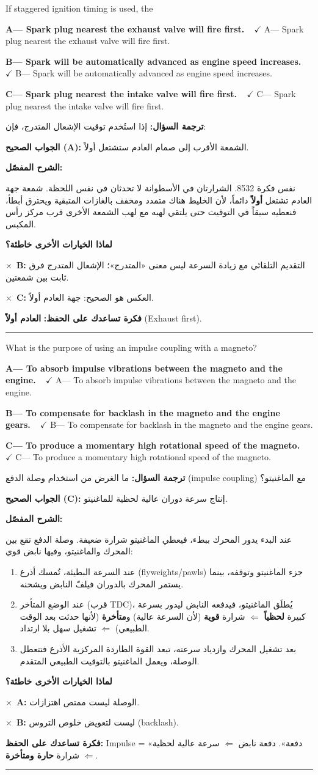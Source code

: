 \documentclass[11pt,a4paper]{article}
\newcommand{\en}[1]{\textenglish{#1}}
\newcommand{\correctletter}{}
\newcommand{\opt}[2]{%
  \ifdefstring{\correctletter}{#1}%
    {\textcolor{ansgreen}{\textbf{#1— #2\ \ $\checkmark$}}}%
    {#1— #2}\par}
\newcommand{\Q}[6]{%
  \renewcommand{\correctletter}{#6}%
  \par\bigskip
  \phantomsection\label{q#1}%
  \begin{tcolorbox}[enhanced,breakable,colback=qback,colframe=qframe,
      arc=2mm,boxrule=0.8pt,fonttitle=\bfseries,
      title={\en{Question #1}}]
    \begin{english}
      #2\par\smallskip
      \opt{A}{#3}\opt{B}{#4}\opt{C}{#5}
    \end{english}
  \end{tcolorbox}}
\newcommand{\tr}[1]{\textbf{\textcolor{qframe}{ترجمة السؤال:}} #1\par}
\newcommand{\ans}[2]{%
  \begin{tcolorbox}[colback=ansback,colframe=ansgreen,boxrule=0.6pt,arc=1.5mm,
      left=4pt,right=4pt,top=2pt,bottom=2pt]
    \textbf{\textcolor{ansgreen}{الجواب الصحيح (\en{#1}):}} #2
  \end{tcolorbox}}
\newcommand{\sharh}[1]{\textbf{\textcolor{conceptc}{الشرح المفصّل:}}\par #1\par}
\newcommand{\nohead}{\textbf{\textcolor{wrongc}{لماذا الخيارات الأخرى خاطئة؟}}\par}
\newcommand{\no}[2]{\hspace*{1em}\textcolor{wrongc}{$\times$}\ \textbf{\en{#1}:} #2\par}
\newcommand{\tip}[1]{%
  \begin{tcolorbox}[colback=tipback,colframe=tipframe,boxrule=0.5pt,arc=1.5mm,
      left=4pt,right=4pt,top=2pt,bottom=2pt]
    \textbf{فكرة تساعدك على الحفظ:} #1
  \end{tcolorbox}}
\newcommand{\qsep}{\par\medskip\noindent\textcolor{qframe!40}{\rule{\linewidth}{0.4pt}}\par}
\begin{document}
\Q{8572}{If staggered ignition timing is used, the}
{Spark plug nearest the exhaust valve will fire first.}
{Spark will be automatically advanced as engine speed increases.}
{Spark plug nearest the intake valve will fire first.}{A}
\tr{إذا استُخدم توقيت الإشعال المتدرج، فإن:}
\ans{A}{الشمعة الأقرب إلى صمام العادم ستشتعل أولاً.}
\sharh{نفس فكرة 8532. الشرارتان في الأسطوانة لا تحدثان في نفس اللحظة. شمعة جهة العادم تشتعل \textbf{أولاً} دائماً، لأن الخليط هناك متمدد ومخفف بالغازات المتبقية ويحترق أبطأ، فنعطيه سبقاً في التوقيت حتى يلتقي لهبه مع لهب الشمعة الأخرى قرب مركز رأس المكبس.}
\nohead
\no{B}{التقديم التلقائي مع زيادة السرعة ليس معنى «المتدرج»؛ الإشعال المتدرج فرق ثابت بين شمعتين.}
\no{C}{العكس هو الصحيح: جهة العادم أولاً.}
\tip{\textbf{العادم أولاً} (\en{Exhaust first}).}
\qsep

\Q{8531}{What is the purpose of using an impulse coupling with a magneto?}
{To absorb impulse vibrations between the magneto and the engine.}
{To compensate for backlash in the magneto and the engine gears.}
{To produce a momentary high rotational speed of the magneto.}{C}
\tr{ما الغرض من استخدام وصلة الدفع (\en{impulse coupling}) مع الماغنيتو؟}
\ans{C}{إنتاج سرعة دوران عالية لحظية للماغنيتو.}
\sharh{عند البدء يدور المحرك ببطء، فيعطي الماغنيتو شرارة ضعيفة. وصلة الدفع تقع بين المحرك والماغنيتو، وفيها نابض قوي:
\begin{enumerate}[label=\arabic*.]
  \item عند السرعة البطيئة، تُمسك أذرع (\en{flyweights/pawls}) جزء الماغنيتو وتوقفه، بينما يستمر المحرك بالدوران فيلفّ النابض ويشحنه.
  \item عند الوضع المتأخر (قرب \en{TDC})، يُطلَق الماغنيتو، فيدفعه النابض ليدور بسرعة كبيرة \textbf{لحظياً} $\Leftarrow$ شرارة \textbf{قوية} (لأن السرعة عالية) و\textbf{متأخرة} (لأنها حدثت بعد الوقت الطبيعي) $\Leftarrow$ تشغيل سهل بلا ارتداد.
  \item بعد تشغيل المحرك وازدياد سرعته، تبعد القوة الطاردة المركزية الأذرع فتتعطل الوصلة، ويعمل الماغنيتو بالتوقيت الطبيعي المتقدم.
\end{enumerate}}
\nohead
\no{A}{الوصلة ليست ممتص اهتزازات.}
\no{B}{ليست لتعويض خلوص التروس (\en{backlash}).}
\tip{\en{Impulse} = «دفعة». دفعة نابض $\Leftarrow$ سرعة عالية لحظية $\Leftarrow$ شرارة \textbf{حارة ومتأخرة}.}
\qsep
\end{document}
